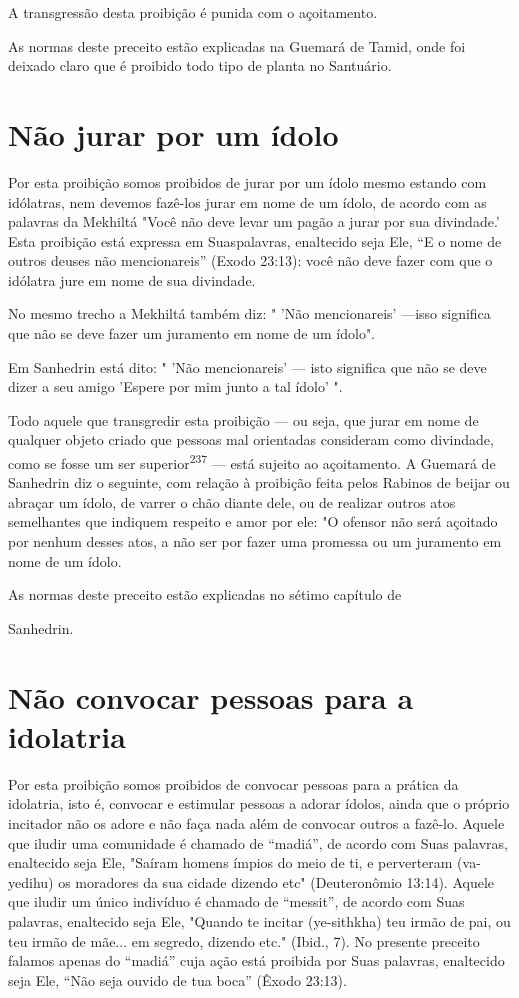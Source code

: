 A transgressão desta proibição é punida com o açoitamento.

As normas deste preceito estão explicadas na Guemará de Tamid, onde foi
deixado claro que é proibido todo tipo de planta no Santuário.

\section{Não jurar por um ídolo}

Por esta proibição somos proibidos de jurar por um ídolo mesmo estando
com idólatras, nem devemos fazê-los jurar em nome de um ídolo, de acordo
com as palavras da Mekhiltá "Você não deve levar um pagão a jurar por
sua divindade.' Esta proibição está expressa em Suaspalavras, enaltecido
seja Ele, ``E o nome de outros deuses não mencionareis'' (Exodo 23:13):
você não deve fazer com que o idólatra jure em nome de sua divindade.

No mesmo trecho a Mekhiltá também diz: " 'Não mencionareis' ---isso
significa que não se deve fazer um juramento em nome de um ídolo".

Em Sanhedrin está dito: " 'Não mencionareis' --- isto significa que não
se deve dizer a seu amigo 'Espere por mim junto a tal ídolo' ".

Todo aquele que transgredir esta proibição --- ou seja, que jurar em
nome de qualquer objeto criado que pessoas mal orientadas consideram
como divindade, como se fosse um ser superior\textsuperscript{237} ---
está sujeito ao açoitamento. A Guemará de Sanhedrin diz o seguinte, com
relação à proibição feita pelos Rabi­nos de beijar ou abraçar um ídolo,
de varrer o chão diante dele, ou de realizar outros atos semelhantes que
indiquem respeito e amor por ele: "O ofensor não será açoitado por
nenhum desses atos, a não ser por fazer uma promessa ou um juramento em
nome de um ídolo.


As normas deste preceito estão explicadas no sétimo capítulo de


Sanhedrin.

\section{Não convocar pessoas para a idolatria}

Por esta proibição somos proibidos de convocar pessoas para a práti­ca
da idolatria, isto é, convocar e estimular pessoas a adorar ídolos,
ainda que o próprio incitador não os adore e não faça nada além de
convocar outros a fazê-lo. Aquele que iludir uma comunidade é chamado de
``madiá'', de acordo com Suas palavras, enaltecido seja Ele, "Saíram
homens ímpios do meio de ti, e per­verteram (va-yedihu) os moradores da
sua cidade dizendo etc" (Deuteronômio 13:14). Aquele que iludir um único
indivíduo é chamado de ``messit'', de acordo com Suas palavras, enaltecido
seja Ele, "Quando te incitar (ye-sithkha) teu irmão de pai, ou teu irmão
de mãe... em segredo, dizendo etc." (Ibid., 7). No presente preceito
falamos apenas do ``madiá'' cuja ação está proibida por Suas palavras,
enaltecido seja Ele, ``Não seja ouvido de tua boca'' (Êxodo 23:13).

